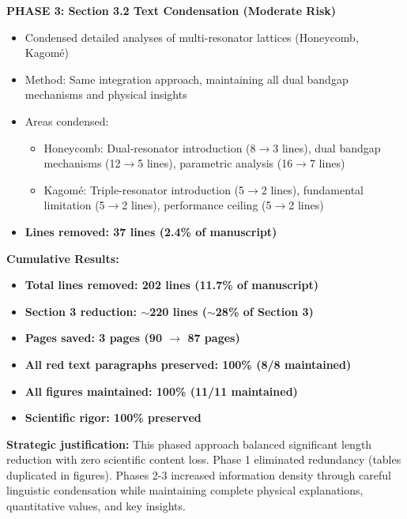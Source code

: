 \documentclass[11pt,a4paper]{article}
\newenvironment{responsebox}{%
    \par\medskip\noindent{\color{responsecolor}\rule{\linewidth}{2pt}}\par
    \noindent{\color{responsecolor}\bfseries Response}\par\smallskip
}{%
    \par\noindent{\color{responsecolor}\rule{\linewidth}{0.5pt}}\medskip
}
\begin{document}
\begin{responsebox}
\textbf{PHASE 3: Section 3.2 Text Condensation (Moderate Risk)}
\begin{itemize}
    \item Condensed detailed analyses of multi-resonator lattices (Honeycomb, Kagomé)
    \item Method: Same integration approach, maintaining all dual bandgap mechanisms and physical insights
    \item Areas condensed:
        \begin{itemize}
            \item Honeycomb: Dual-resonator introduction (8$\rightarrow$3 lines), dual bandgap mechanisms (12$\rightarrow$5 lines), parametric analysis (16$\rightarrow$7 lines)
            \item Kagomé: Triple-resonator introduction (5$\rightarrow$2 lines), fundamental limitation (5$\rightarrow$2 lines), performance ceiling (5$\rightarrow$2 lines)
        \end{itemize}
    \item \textbf{Lines removed: 37 lines (2.4\% of manuscript)}
\end{itemize}

\textbf{Cumulative Results:}
\begin{itemize}
    \item \textbf{Total lines removed: 202 lines (11.7\% of manuscript)}
    \item \textbf{Section 3 reduction: $\sim$220 lines ($\sim$28\% of Section 3)}
    \item \textbf{Pages saved: 3 pages (90 $\rightarrow$ 87 pages)}
    \item \textbf{All red text paragraphs preserved: 100\% (8/8 maintained)}
    \item \textbf{All figures maintained: 100\% (11/11 maintained)}
    \item \textbf{Scientific rigor: 100\% preserved}
\end{itemize}

\textbf{Strategic justification:} This phased approach balanced significant length reduction with zero scientific content loss. Phase 1 eliminated redundancy (tables duplicated in figures). Phases 2-3 increased information density through careful linguistic condensation while maintaining complete physical explanations, quantitative values, and key insights.
\end{responsebox}
\end{document}
